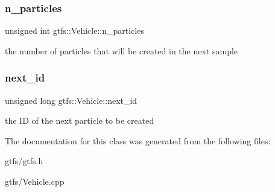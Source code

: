 \subsubsection{\texorpdfstring{n\+\_\+particles}{n\_particles}}
{\footnotesize\ttfamily unsigned int gtfs\+::\+Vehicle\+::n\+\_\+particles}

the number of particles that will be created in the next sample \mbox{\label{classgtfs_1_1Vehicle_aab535dd9953f9650e2adc351965779b1}} 
\subsubsection{\texorpdfstring{next\+\_\+id}{next\_id}}
{\footnotesize\ttfamily unsigned long gtfs\+::\+Vehicle\+::next\+\_\+id}

the ID of the next particle to be created 

The documentation for this class was generated from the following files\+:\begin{DoxyCompactItemize}
\item 
gtfs/gtfs.\+h\item 
gtfs/Vehicle.\+cpp\end{DoxyCompactItemize}
